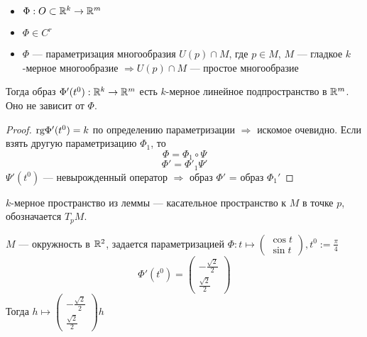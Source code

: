 

\cfoot{}



\begin{lemma}\itemfix
    \begin{itemize}
        \item $\Phi : O\subset\mathbb{R}^k \to\mathbb{R}^m$
        \item $\Phi\in C^r$
        \item $\Phi$ --- параметризация многообразия $U(p)\cap M$, где $p\in M$, $M$ --- гладкое $k$-мерное многообразие $\Rightarrow U(p)\cap M$ --- простое многообразие
    \end{itemize}
    Тогда образ $\Phi'(t^0) : \mathbb{R}^k \to \mathbb{R}^m$ есть $k$-мерное линейное подпространство в $\mathbb{R}^m$. Оно не зависит от $\Phi$.
\end{lemma}
\begin{proof}
    $\text{rg} \Phi'(t^0) = k$ по определению параметризации $\Rightarrow$ искомое очевидно. Если взять другую параметризацию $\Phi_1$, то $$\Phi = \Phi_1 \circ \Psi$$
    $$\Phi' = \Phi'_1 \Psi'$$
    $\Psi'(t^0)$ --- невырожденный оператор $\Rightarrow$ образ $\Phi'$ = образ $\Phi_1'$
\end{proof}

\begin{definition}
    $k$-мерное пространство из леммы --- касательное пространство к $M$ в точке $p$, обозначается $T_pM$.
\end{definition}

\begin{example}
    $M$ --- окружность в $\mathbb{R}^2$, задается параметризацией $\Phi : t\mapsto \begin{pmatrix}
            \cos t \\
            \sin t
        \end{pmatrix}, t^0 := \frac{\pi}{4}$
    $$\Phi'(t^0) = \begin{pmatrix}
            -\frac{\sqrt{2}}{2} \\
            \frac{\sqrt{2}}{2}
        \end{pmatrix}$$
    Тогда $h \mapsto \begin{pmatrix}
            -\frac{\sqrt{2}}{2} \\
            \frac{\sqrt{2}}{2}
        \end{pmatrix} h$
\end{example}

